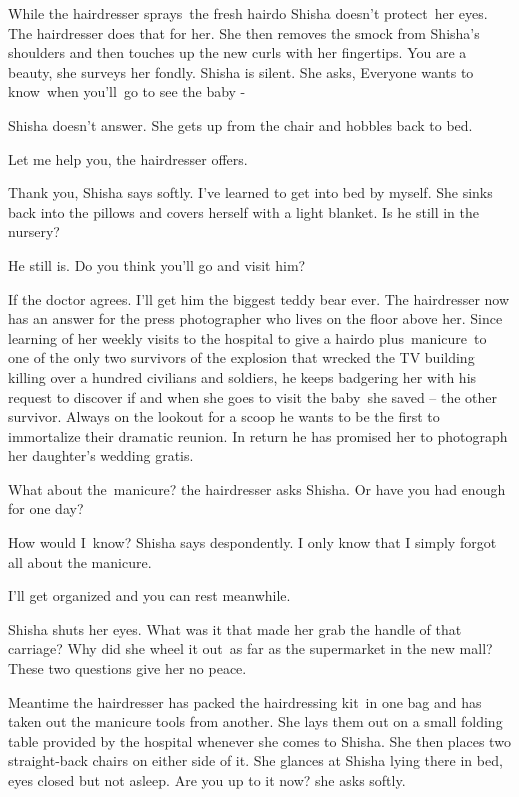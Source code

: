 \documentclass[twoside,11pt]{book}
\begin{document}
While the hairdresser sprays\ the fresh hairdo Shisha doesn't protect{\ }her
eyes. The hairdresser does that for her. She then removes the smock from Shisha's shoulders and then touches up the new
curls with her fingertips. {\textquotedbl}You are a beauty,{\textquotedbl} she surveys her fondly. Shisha is silent.
She asks, {\textquotedbl}Everyone wants to know\ when you'll~go to see the baby - {\textquotedbl} 

Shisha doesn't answer. She gets up from the chair and hobbles back to bed. 

{\textquotedbl}Let me help you,{\textquotedbl} the hairdresser offers.

{\textquotedbl}Thank you,{\textquotedbl} Shisha says softly. {\textquotedbl}I've learned to get into bed by
myself.{\textquotedbl} She sinks back into the pillows and covers herself with a light blanket. {\textquotedbl}Is he
still in the nursery?{\textquotedbl}\ \ 

{\textquotedbl}He still is. Do you think you'll go and visit him?{\textquotedbl} 

{\textquotedbl}If the doctor agrees. I'll get him the biggest teddy bear ever.{\textquotedbl} The hairdresser now has an
answer for the press photographer who lives on the floor above her. Since learning of her weekly visits to the hospital
to give a hairdo plus~manicure~to one of the only two survivors of the explosion that wrecked the TV building killing
over a hundred civilians and soldiers, he keeps badgering her with his request to discover if and when she goes to
visit the baby~she saved -- the other survivor. Always on the lookout for a scoop he wants to be the first to
immortalize their dramatic reunion. In return he has promised her to photograph her daughter's wedding gratis.~ 

{\textquotedbl}What about the~manicure?{\textquotedbl} the hairdresser asks Shisha. {\textquotedbl}Or have you had
enough for one day?{\textquotedbl} 

{\textquotedbl}How would I~know?{\textquotedbl} Shisha says despondently. {\textquotedbl}I only know that I simply
forgot all about the manicure.{\textquotedbl} 

{\textquotedbl}I'll get organized and you can rest meanwhile.{\textquotedbl} 

Shisha shuts her eyes. What was it that made her grab the handle of that carriage? Why did she wheel it out\ as far as
the supermarket in the new mall? These two questions give her no peace. 

Meantime the hairdresser has packed the hairdressing kit~in one bag and has taken out the manicure tools from another.
She lays them out on a small folding table provided by the hospital whenever she comes to Shisha. She then places two
straight-back chairs on either side of it. She glances at Shisha lying there in bed, eyes closed but not asleep.
{\textquotedbl}Are you up to it now?{\textquotedbl} she asks softly.
\end{document}
